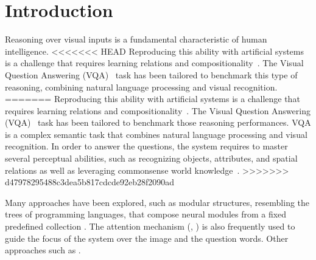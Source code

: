 \section{Introduction}
Reasoning over visual inputs is a fundamental characteristic of human intelligence.
<<<<<<< HEAD
Reproducing this ability with artificial systems is a challenge that requires learning relations and compositionality~\citep{hu2017learning, johnson2017inferring}. The Visual Question Answering (VQA)~\citep{antol2015vqa,malinowski2014towards,wu2017visual} task has been tailored to benchmark this type of reasoning, combining natural language processing and visual recognition.
=======
Reproducing this ability with artificial systems is a challenge that requires learning relations and compositionality~\citep{hu2017learning, johnson2017inferring}. The Visual Question Answering (VQA)~\citep{antol2015vqa,malinowski2014towards,wu2017visual} task has been tailored to benchmark those reasoning performances. VQA is a complex semantic task that combines natural language processing and visual recognition.
In order to answer the questions, the system requires to master several perceptual abilities, such as recognizing objects, attributes, and spatial relations as well as leveraging commonsense world knowledge~\citep{hudson2018compositional}.
>>>>>>> d47978295488c3dea5b817cdcde92eb28f2090ad


Many approaches have been explored, 
such as modular structures, resembling the trees of programming languages, that compose neural modules from a fixed predefined collection \cite{andreas2016learning,johnson2017inferring, mascharka2018transparency}. The attention mechanism (\cite{bahdanau2014neural}, \cite{xu2015show}) is also frequently used to guide the focus of the system over the image and the question words.
Other approaches such as .


